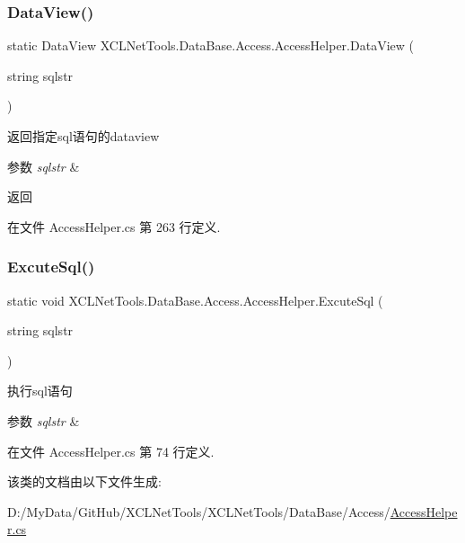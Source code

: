 \subsubsection{\texorpdfstring{Data\+View()}{DataView()}}
{\footnotesize\ttfamily static Data\+View X\+C\+L\+Net\+Tools.\+Data\+Base.\+Access.\+Access\+Helper.\+Data\+View (\begin{DoxyParamCaption}\item[{string}]{sqlstr }\end{DoxyParamCaption})\hspace{0.3cm}{\ttfamily [static]}}



返回指定sql语句的dataview 


\begin{DoxyParams}{参数}
{\em sqlstr} & \\
\hline
\end{DoxyParams}
\begin{DoxyReturn}{返回}

\end{DoxyReturn}


在文件 Access\+Helper.\+cs 第 263 行定义.

\mbox{\label{class_x_c_l_net_tools_1_1_data_base_1_1_access_1_1_access_helper_acb4489fbc85621f6b27e51328e60ba40}} 
\subsubsection{\texorpdfstring{Excute\+Sql()}{ExcuteSql()}}
{\footnotesize\ttfamily static void X\+C\+L\+Net\+Tools.\+Data\+Base.\+Access.\+Access\+Helper.\+Excute\+Sql (\begin{DoxyParamCaption}\item[{string}]{sqlstr }\end{DoxyParamCaption})\hspace{0.3cm}{\ttfamily [static]}}



执行sql语句 


\begin{DoxyParams}{参数}
{\em sqlstr} & \\
\hline
\end{DoxyParams}


在文件 Access\+Helper.\+cs 第 74 行定义.



该类的文档由以下文件生成\+:\begin{DoxyCompactItemize}
\item 
D\+:/\+My\+Data/\+Git\+Hub/\+X\+C\+L\+Net\+Tools/\+X\+C\+L\+Net\+Tools/\+Data\+Base/\+Access/\hyperlink{_access_helper_8cs}{Access\+Helper.\+cs}\end{DoxyCompactItemize}
